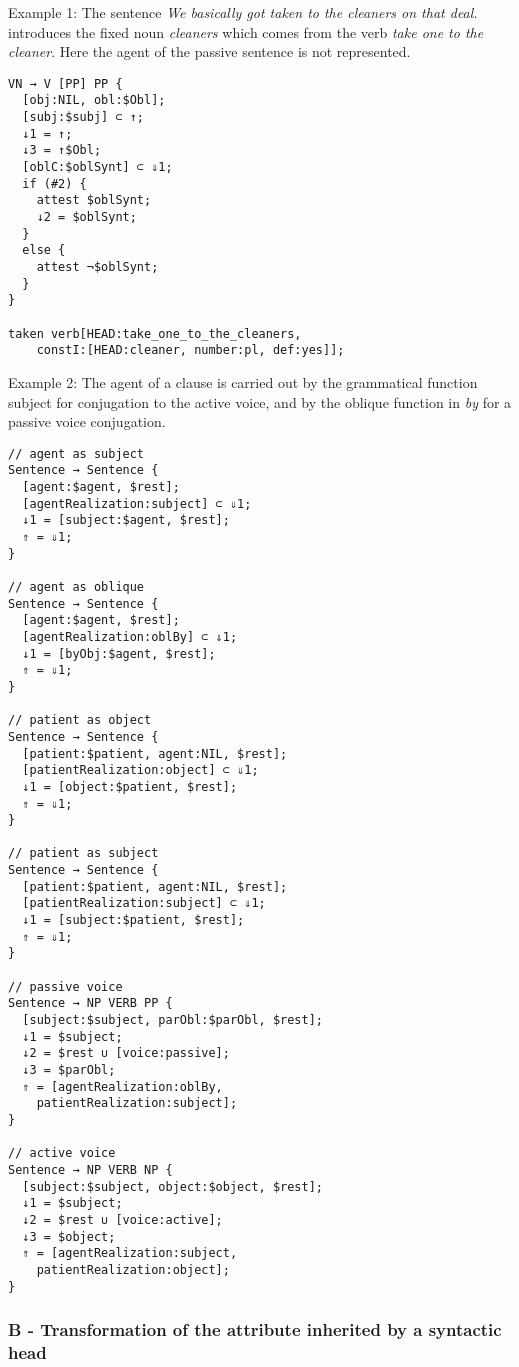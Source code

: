 \documentclass[11pt]{article}
\begin{document}
Example 1: The sentence \textit{We basically got taken to the cleaners
  on that deal.} introduces the fixed noun \textit{cleaners} which
comes from the verb \textit{take one to the cleaner}. Here the agent of the
passive sentence is not represented.

\begin{lstlisting}
VN → V [PP] PP {
  [obj:NIL, obl:$Obl];
  [subj:$subj] ⊂ ↑;
  ↓1 = ↑;
  ↓3 = ↑$Obl;
  [oblC:$oblSynt] ⊂ ⇓1;
  if (#2) {
    attest $oblSynt;
    ↓2 = $oblSynt;
  }
  else {
    attest ¬$oblSynt;
  }
}

taken verb[HEAD:take_one_to_the_cleaners, 
	constI:[HEAD:cleaner, number:pl, def:yes]];
\end{lstlisting}

Example 2:
The agent of a clause is carried out by the grammatical function subject
for conjugation to the active voice, and by the oblique function in
\textit{by} for a passive voice conjugation.

\begin{lstlisting}
// agent as subject
Sentence → Sentence {
  [agent:$agent, $rest];
  [agentRealization:subject] ⊂ ⇓1;
  ↓1 = [subject:$agent, $rest];
  ⇑ = ⇓1;
}

// agent as oblique
Sentence → Sentence {
  [agent:$agent, $rest];
  [agentRealization:oblBy] ⊂ ⇓1;
  ↓1 = [byObj:$agent, $rest];
  ⇑ = ⇓1;
}

// patient as object
Sentence → Sentence {
  [patient:$patient, agent:NIL, $rest];
  [patientRealization:object] ⊂ ⇓1;
  ↓1 = [object:$patient, $rest];
  ⇑ = ⇓1;
}

// patient as subject
Sentence → Sentence {
  [patient:$patient, agent:NIL, $rest];
  [patientRealization:subject] ⊂ ⇓1;
  ↓1 = [subject:$patient, $rest];
  ⇑ = ⇓1;
}

// passive voice
Sentence → NP VERB PP {
  [subject:$subject, parObl:$parObl, $rest];
  ↓1 = $subject;
  ↓2 = $rest ∪ [voice:passive];
  ↓3 = $parObl;
  ⇑ = [agentRealization:oblBy, 
	patientRealization:subject];
}

// active voice
Sentence → NP VERB NP {
  [subject:$subject, object:$object, $rest];
  ↓1 = $subject;
  ↓2 = $rest ∪ [voice:active];
  ↓3 = $object;
  ⇑ = [agentRealization:subject, 
	patientRealization:object];
}
\end{lstlisting}

\subsubsection*{B - Transformation of the attribute inherited by a syntactic head}
\end{document}
